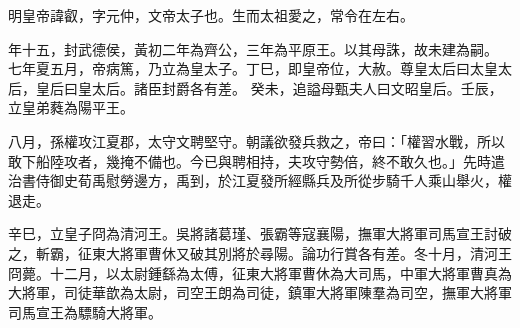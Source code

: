 \begin{pinyinscope}
 
 
 明皇帝諱叡，字元仲，文帝太子也。生而太祖愛之，常令在左右。
 
 
 年十五，封武德侯，黃初二年為齊公，三年為平原王。以其母誅，故未建為嗣。
 七年夏五月，帝病篤，乃立為皇太子。丁巳，即皇帝位，大赦。尊皇太后曰太皇太后，皇后曰皇太后。諸臣封爵各有差。
 癸未，追謚母甄夫人曰文昭皇后。壬辰，立皇弟蕤為陽平王。
 
 
 
 
 八月，孫權攻江夏郡，太守文聘堅守。朝議欲發兵救之，帝曰：「權習水戰，所以敢下船陸攻者，幾掩不備也。今已與聘相持，夫攻守勢倍，終不敢久也。」先時遣治書侍御史荀禹慰勞邊方，禹到，於江夏發所經縣兵及所從步騎千人乘山舉火，權退走。
 
 
 
 
 辛巳，立皇子冏為清河王。吳將諸葛瑾、張霸等寇襄陽，撫軍大將軍司馬宣王討破之，斬霸，征東大將軍曹休又破其別將於尋陽。論功行賞各有差。冬十月，清河王冏薨。十二月，以太尉鍾繇為太傅，征東大將軍曹休為大司馬，中軍大將軍曹真為大將軍，司徒華歆為太尉，司空王朗為司徒，鎮軍大將軍陳羣為司空，撫軍大將軍司馬宣王為驃騎大將軍。
 

\end{pinyinscope}
